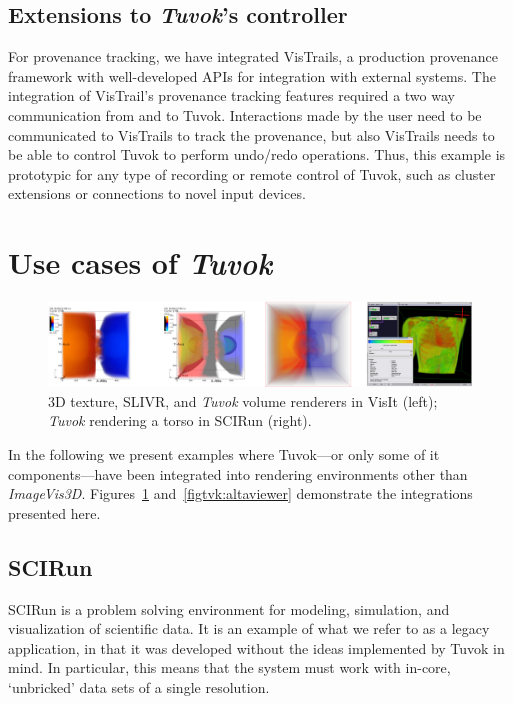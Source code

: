 \subsection{Extensions to \textit{Tuvok}'s controller}

For provenance tracking, we have integrated VisTrails, a production
provenance framework with well-developed APIs
for integration with external systems. The integration of
VisTrail’s provenance tracking features required a two way
communication from and to Tuvok. Interactions made by
the user need to be communicated to VisTrails to track the
provenance, but also VisTrails needs to be able to control Tuvok
to perform undo/redo operations. Thus, this example is
prototypic for any type of recording or remote control of Tuvok,
such as cluster extensions or connections to novel input
devices.

\section{Use cases of \textit{Tuvok}}
\label{sec:tvk-uses}

\begin{figure}
	\includegraphics[width=\linewidth]{images/arch/integration}

  \caption{3D texture, SLIVR, and \textit{Tuvok} volume renderers in
  VisIt (left); \textit{Tuvok} rendering a torso in SCIRun (right).}
	\label{figtvk:integration}
\end{figure}

In the following we present examples where Tuvok---or only some of it
components---have been integrated into rendering environments other
than
\textit{ImageVis3D}. Figures~\ref{figtvk:integration}
and~\ref{figtvk:altaviewer} demonstrate the integrations presented here.

\subsection{SCIRun}

SCIRun is a problem solving environment for modeling,
simulation, and visualization of scientific data. It is an example
of what we refer to as a legacy application, in that it
was developed without the ideas implemented by Tuvok in
mind. In particular, this means that the system must work
with in-core, `unbricked' data sets of a single resolution.


